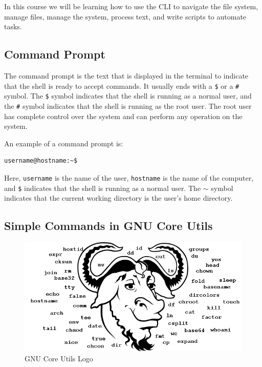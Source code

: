 In this course we will be learning how to use the CLI to navigate the file system, manage files, manage the system, process text, and write scripts to automate tasks.

\subsection{Command Prompt}

The command prompt is the text that is displayed in the terminal to indicate that the shell is ready to accept commands. It usually ends with a \texttt{\$} or a \texttt{\#} symbol. The \texttt{\$} symbol indicates that the shell is running as a normal user, and the \texttt{\#} symbol indicates that the shell is running as the root user. The root user has complete control over the system and can perform any operation on the system.

An example of a command prompt is:

\begin{lstlisting}[language=bash]
  username@hostname:~$
\end{lstlisting}

Here, \texttt{username} is the name of the user, \texttt{hostname} is the name of the computer, and \texttt{\$} indicates that the shell is running as a normal user.
The $\sim$ symbol indicates that the current working directory is the user's home directory.

\subsection{Simple Commands in GNU Core Utils}

\begin{figure}[hb]
	\includegraphics{images/png/gnu.png}
	\caption[GNU Core Utils Logo]{GNU Core Utils Logo}
\end{figure}

